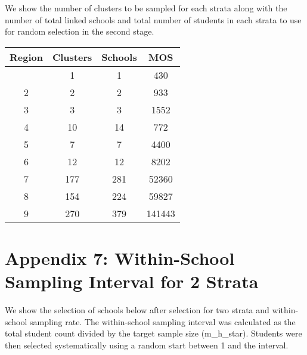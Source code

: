 \documentclass[
  12pt]{article}
\begin{document}
We show the number of clusters to be sampled for each strata along with
the number of total linked schools and total number of students in each
strata to use for random selection in the second stage.

\begin{longtable}[]{@{}cccc@{}}
\toprule\noalign{}
Region & Clusters & Schools & MOS \\
\midrule\noalign{}
\endhead
\bottomrule\noalign{}
\endlastfoot
1 & 1 & 1 & 430 \\
2 & 2 & 2 & 933 \\
3 & 3 & 3 & 1552 \\
4 & 10 & 14 & 772 \\
5 & 7 & 7 & 4400 \\
6 & 12 & 12 & 8202 \\
7 & 177 & 281 & 52360 \\
8 & 154 & 224 & 59827 \\
9 & 270 & 379 & 141443 \\
\end{longtable}

\newpage

\section{Appendix 7: Within-School Sampling Interval for 2
Strata}\label{appendix-7-within-school-sampling-interval-for-2-strata}

We show the selection of schools below after selection for two strata
and within-school sampling rate. The within-school sampling interval was
calculated as the total student count divided by the target sample size
(m\_h\_star). Students were then selected systematically using a random
start between 1 and the interval.
\end{document}
